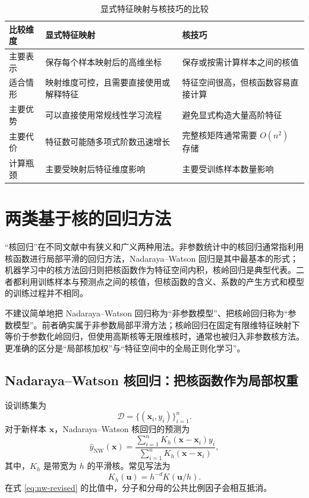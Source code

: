 \documentclass[UTF8,zihao=-4,openany]{ctexbook}
\begin{document}
\begin{table}[htbp]
  \centering
  \caption{显式特征映射与核技巧的比较}
  \label{tab:explicit-vs-kernel-revised}
  \renewcommand{\arraystretch}{1.35}
  \begin{tabular}{
    >{\raggedright\arraybackslash}p{3.1cm}
    >{\raggedright\arraybackslash}p{5.0cm}
    >{\raggedright\arraybackslash}p{5.0cm}}
    \toprule
    比较维度 & 显式特征映射 & 核技巧 \\
    \midrule
    主要表示
      & 保存每个样本映射后的高维坐标
      & 保存或按需计算样本之间的核值 \\
    适合情形
      & 映射维度可控，且需要直接使用或解释特征
      & 特征空间很高，但核函数容易直接计算 \\
    主要优势
      & 可以直接使用常规线性学习流程
      & 避免显式构造大量高阶特征 \\
    主要代价
      & 特征数可能随多项式阶数迅速增长
      & 完整核矩阵通常需要 $O(n^2)$ 存储 \\
    计算瓶颈
      & 主要受映射后特征维度影响
      & 主要受训练样本数量影响 \\
    \bottomrule
  \end{tabular}
\end{table}

\section{两类基于核的回归方法}

“核回归”在不同文献中有狭义和广义两种用法。非参数统计中的核回归通常指利用核函数进行局部平滑的回归方法，Nadaraya--Watson 回归是其中最基本的形式；机器学习中的核方法回归则把核函数作为特征空间内积，核岭回归是典型代表。二者都利用训练样本与预测点之间的核值，但核函数的含义、系数的产生方式和模型的训练过程并不相同。

不建议简单地把 Nadaraya--Watson 回归称为“非参数模型”、把核岭回归称为“参数模型”。前者确实属于非参数局部平滑方法；核岭回归在固定有限维特征映射下等价于参数化岭回归，但使用高斯核等无限维核时，通常也被归入非参数核方法。更准确的区分是“局部核加权”与“特征空间中的全局正则化学习”。

\subsection{Nadaraya--Watson 核回归：把核函数作为局部权重}

设训练集为
\[
  \mathcal D
  =
  \{(\boldsymbol{x}_i,y_i)\}_{i=1}^{n}.
\]
对于新样本 $\boldsymbol{x}$，Nadaraya--Watson 核回归的预测为
\begin{equation}
  \widehat y_{\mathrm{NW}}(\boldsymbol{x})
  =
  \frac{
    \sum_{i=1}^{n}
    K_h(\boldsymbol{x}-\boldsymbol{x}_i)y_i
  }{
    \sum_{i=1}^{n}
    K_h(\boldsymbol{x}-\boldsymbol{x}_i)
  },
  \label{eq:nw-revised}
\end{equation}
其中，$K_h$ 是带宽为 $h$ 的平滑核。常见写法为
\[
  K_h(\boldsymbol{u})
  =
  h^{-d}K(\boldsymbol{u}/h).
\]
在式 \eqref{eq:nw-revised} 的比值中，分子和分母的公共比例因子会相互抵消。
\end{document}
